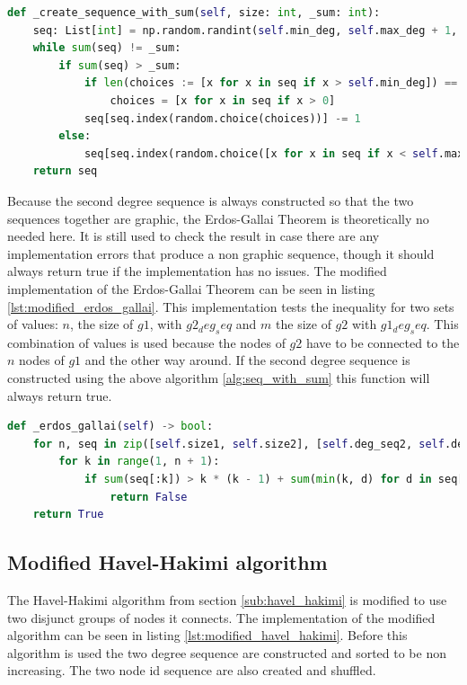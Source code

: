 \begin{lstlisting}[language=python, caption={Algorithm for creating a sequence with specific sum}, label={lst:seq_with_sum}]
def _create_sequence_with_sum(self, size: int, _sum: int):
    seq: List[int] = np.random.randint(self.min_deg, self.max_deg + 1, size=(size)).tolist()
    while sum(seq) != _sum:
        if sum(seq) > _sum:
            if len(choices := [x for x in seq if x > self.min_deg]) == 0:
                choices = [x for x in seq if x > 0]
            seq[seq.index(random.choice(choices))] -= 1
        else:
            seq[seq.index(random.choice([x for x in seq if x < self.max_deg]))] += 1
    return seq
\end{lstlisting}

Because the second degree sequence is always constructed so that the two sequences together are graphic, the Erdos-Gallai Theorem is theoretically no needed here. It is still used to check the result in case there are any implementation errors that produce a non graphic sequence, though it should always return true if the implementation has no issues. The modified implementation of the Erdos-Gallai Theorem can be seen in listing \ref{lst:modified_erdos_gallai}. This implementation tests the inequality for two sets of values: $n$, the size of $g1$, with $g2_deg_seq$ and $m$ the size of $g2$ with $g1_deg_seq$. This combination of values is used because the nodes of $g2$ have to be connected to the $n$ nodes of $g1$ and the other way around. If the second degree sequence is constructed using the above algorithm \ref{alg:seq_with_sum} this function will always return true.

\begin{lstlisting}[language=python, caption={Modified Erdos-Gallai Theorem for connecting to disjunct groups}, label={lst:modified_erdos_gallai}]
def _erdos_gallai(self) -> bool:
    for n, seq in zip([self.size1, self.size2], [self.deg_seq2, self.deg_seq1]):
        for k in range(1, n + 1):
            if sum(seq[:k]) > k * (k - 1) + sum(min(k, d) for d in seq[k + 1 :]):
                return False
    return True
\end{lstlisting}



\subsection{Modified Havel-Hakimi algorithm}
The Havel-Hakimi algorithm from section \ref{sub:havel_hakimi} is modified to use two disjunct groups of nodes it connects. The implementation of the modified algorithm can be seen in listing \ref{lst:modified_havel_hakimi}. Before this algorithm is used the two degree sequence are constructed and sorted to be non increasing. The two node id sequence are also created and shuffled.

